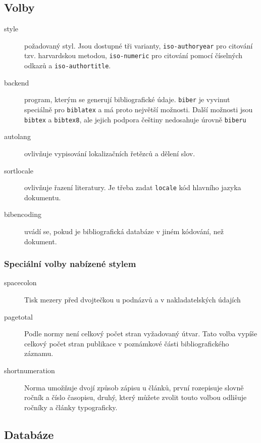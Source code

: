\documentclass[a4paper,10pt]{ltxdockit}
\def\t|#1|{\texttt{#1}}
\begin{document}
\subsection{Volby}
\begin{description}
\item[style] požadovaný styl. Jsou dostupné tři varianty, \t|iso-authoryear|
  pro citování tzv. harvardskou metodou, \t|iso-numeric| pro citování pomocí
  číselných odkazů a \t|iso-authortitle|.

\item[backend] program, kterým se generují bibliografické údaje. \t|biber| je
  vyvinut speciálně pro \t|biblatex| a má proto největší možnosti. Další
  možnosti jsou \t|bibtex| a \t|bibtex8|, ale jejich podpora češtiny nedosahuje
  úrovně \t|biberu|

\item[autolang] ovlivňuje vypisování lokalizačních řetězců a dělení slov.
\item[sortlocale] ovlivňuje řazení literatury. Je třeba zadat \t|locale| kód hlavního jazyka dokumentu.
\item[bibencoding] uvádí se, pokud je bibliografická databáze v jiném kódování, než dokument. 

\end{description}

\subsubsection{Speciální volby nabízené stylem}

\begin{description}
  \item[spacecolon] Tisk mezery před dvojtečkou u podnázvů a v nakladatelských údajích
  \item[pagetotal] Podle normy není celkový počet stran vyžadovaný útvar. Tato
    volba vypíše celkový počet stran publikace v poznámkové části
    bibliografického záznamu.
  \item[shortnumeration] Norma umožňuje dvojí způsob zápisu u článků, první
    rozepisuje slovně ročník a číslo časopisu, druhý, který můžete zvolit touto
    volbou odlišuje ročníky a články typograficky.
\end{description}


\subsection{Databáze}
\end{document}
